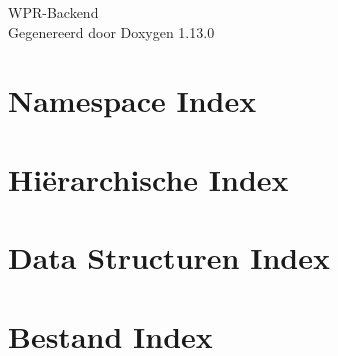 \documentclass[twoside]{book}
\newcommand{\+}{\discretionary{\mbox{\scriptsize$\hookleftarrow$}}{}{}}
\newcommand{\clearemptydoublepage}{%
    \newpage{\pagestyle{empty}\cleardoublepage}%
  }
\begin{document}
  \raggedbottom
    \hypersetup{pageanchor=false,
                bookmarksnumbered=true,
                pdfencoding=unicode
               }
  \begin{titlepage}
  \vspace*{7cm}
  \begin{center}%
  {\Large WPR-\/\+Backend}\\
  \vspace*{1cm}
  {\large Gegenereerd door Doxygen 1.13.0}\\
  \end{center}
  \end{titlepage}
  \clearemptydoublepage
  \tableofcontents
  \clearemptydoublepage
  \hypersetup{pageanchor=true}
\chapter{Namespace Index}

\chapter{Hiërarchische Index}

\chapter{Data Structuren Index}

\chapter{Bestand Index}

\end{document}
